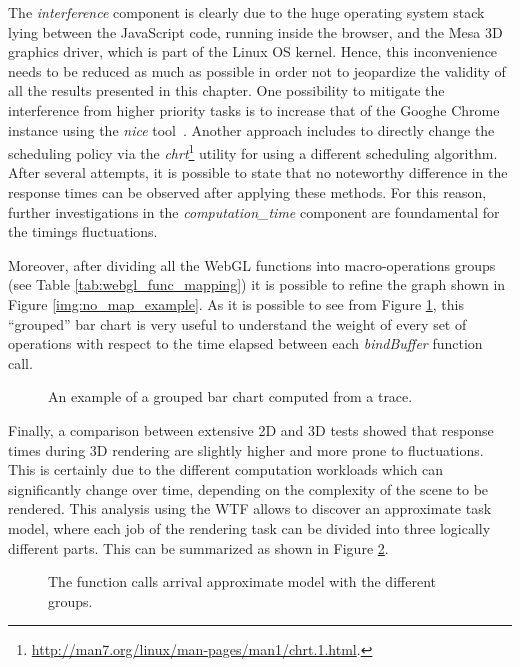 The \emph{interference} component is clearly due to the huge operating system
stack lying between the JavaScript code, running inside the
browser, and the Mesa 3D graphics driver, which is part of the Linux OS kernel.
Hence, this inconvenience needs to be reduced as much as possible in order not to jeopardize the
validity of all the results presented in this chapter. One possibility to mitigate
the interference from higher priority tasks is to increase that of
the Googhe Chrome instance using the \emph{nice} tool~\cite{aas2005understanding}.
Another approach includes to directly change the scheduling policy via the
\emph{chrt}\footnote{\url{http://man7.org/linux/man-pages/man1/chrt.1.html}.}
utility for using a different scheduling algorithm. After several attempts,
it is possible to state that no
noteworthy difference in the response times can be observed after applying these
methods. For this reason, further investigations in the \emph{computation\_time}
component are foundamental for the timings fluctuations.

Moreover, after dividing all the WebGL functions into macro-operations groups
(see Table \ref{tab:webgl_func_mapping}) it is possible to refine the graph shown
in Figure \ref{img:no_map_example}. As it is possible to see from Figure
\ref{img:no_map_groups}, this ``grouped'' bar chart is very useful to understand
the weight of every set of operations with respect to the time elapsed between
each \emph{bindBuffer} function call.
\begin{figure}[!htb]
    \caption{An example of a grouped bar chart computed from a trace.}
    \label{img:no_map_groups}
\end{figure}

Finally, a comparison between extensive 2D and 3D tests showed that response times
during 3D rendering are slightly higher and more prone to fluctuations. This is
certainly due to the different computation workloads which can significantly change
over time, depending on the complexity of the scene to be rendered.
This analysis using the WTF allows to discover an approximate task model, where
each job of the rendering task can be divided into three logically different
parts. This can be summarized as shown in Figure \ref{img:call_arrival}.
\begin{figure}[!htb]
    \caption{The function calls arrival approximate model with the different groups.}
    \label{img:call_arrival}
\end{figure}


